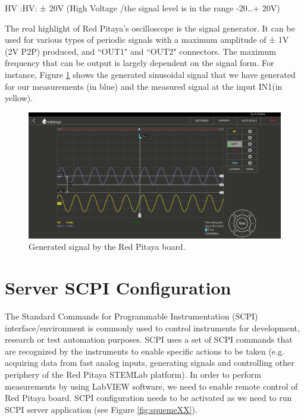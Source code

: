 \documentclass[12pt]{extarticle}
\begin{document}
HV :HV: ± 20V (High Voltage /the  signal level is in the range -20…+ 20V)

The real highlight of Red Pitaya’s oscilloscope is the signal generator. It can be used for various types of periodic signals with a maximum amplitude of ± 1V (2V P2P) produced, and ``OUT1" and ``OUT2" connectors. The maximum frequency that can be output is largely dependent on the signal form. For instance, Figure \ref{fig:signal} shows the generated sinusoidal signal that we have generated for our measurements (in blue) and the measured signal at the input IN1(in yellow).

\begin{figure}[!h]
	\begin{center}
		\includegraphics[width=1\textwidth]{images2/connect-14} 
		\caption{Generated signal by the Red Pitaya board.}
		\label{fig:signal}
	\end{center}
\end{figure}

\section{Server SCPI Configuration}

The Standard Commands for Programmable Instrumentation (SCPI) interface/environment is commonly used to control instruments for development, research or test automation purposes. SCPI uses a set of SCPI commands that are recognized by the instruments to enable specific actions to be taken (e.g. acquiring data from fast analog inputs, generating signals and controlling other periphery of the Red Pitaya STEMLab platform). In order to perform measurements by using LabVIEW software, we need to enable remote control of Red Pitaya board. SCPI configuration needs to be activated as we need to run SCPI server application (see Figure \ref{fig:squemeXX}).
\end{document}
